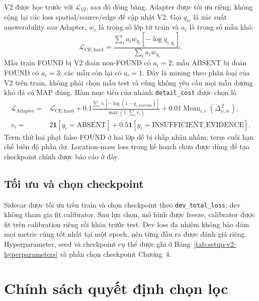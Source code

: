 V2 được học trước với $\mathcal{L}_{V2}$, sau đó đóng băng.
Adapter được tối ưu riêng; không cộng lại các loss spatial/source/edge
để cập nhật V2. Gọi $q_{ic}$ là xác suất answerability sau Adapter,
$w_c$ là trọng số lớp từ train và $a_i$ là trọng số mẫu khó:
\begin{equation}
    \mathcal{L}_{\mathrm{CE,hard}}=
    \frac{\sum_i a_iw_{y_i}[-\log q_{i,y_i}]}{\sum_i a_iw_{y_i}}.
\end{equation}
Mẫu train FOUND bị V2 đoán non-FOUND có $a_i=2$;
mẫu ABSENT bị đoán FOUND có $a_i=3$; các mẫu còn lại có $a_i=1$.
Đây là mining theo phân loại của V2 trên train, không phải chọn mẫu test
và cũng không yêu cầu mọi mẫu dương khó đã có MAP đúng.
Hàm mục tiêu của nhánh \texttt{detail\_cost} được chọn là
\begin{equation}
\begin{split}
    \mathcal{L}_{\mathrm{Adapter}}={}&\mathcal{L}_{\mathrm{CE,hard}}
    +0.1\frac{\sum_i v_i[-\log(1-q_{i,\mathrm{FOUND}})]}
                {\max(1,\sum_i v_i)}
    +0.01\operatorname{Mean}_{i,c}(\Delta_{\psi,ic}^{\,2}),\\
    v_i={}&2\mathbf{1}[y_i=\mathrm{ABSENT}]
           +0.5\mathbf{1}[y_i=\mathrm{INSUFFICIENT\_EVIDENCE}].
\end{split}
    \label{eq:method-adapter-loss}
\end{equation}
Term thứ hai phạt false FOUND ở hai lớp dễ bị chấp nhận nhầm;
term cuối hạn chế biên độ phần dư. Location-mass loss trong kế hoạch
chưa được dùng để tạo checkpoint chính được báo cáo ở đây.

\subsection{Tối ưu và chọn checkpoint}

Sidecar được tối ưu trên train và chọn checkpoint theo
\texttt{dev\_total\_loss}; dev không tham gia fit calibrator.
Sau lựa chọn, mô hình được freeze, calibrator được fit trên calibration
riêng rồi khóa trước test. Dev loss đa nhiệm không bảo đảm mọi metric
cùng tốt nhất tại một epoch, nên từng đầu ra được đánh giá riêng.
Hyperparameter, seed và checkpoint cụ thể được ghi ở
Bảng~\ref{tab:setup-v2-hyperparameters} và phần chọn checkpoint Chương~4.

\section{Chính sách quyết định chọn lọc}
\label{sec:method-policy}

